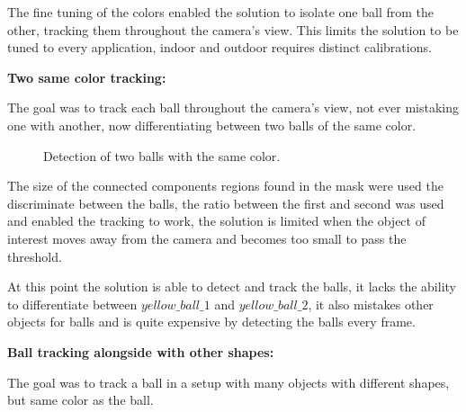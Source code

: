 \documentclass[10pt,twocolumn,letterpaper]{article}
\begin{document}
The fine tuning of the colors enabled the solution to isolate one ball from
the other, tracking them throughout the camera's view. This limits the
solution to be tuned to every application, indoor  and outdoor requires
distinct calibrations.

\bigbreak{}
\textbf{Two same color tracking:}
\bigbreak{}

The goal was to track each ball throughout the camera's view, not ever
mistaking one with another, now differentiating between two balls of the same
color.

\begin{figure}[!h]
\centering
\setlength{\fboxsep}{1pt}
\setlength{\fboxrule}{1pt}
\caption{Detection of two balls with the same color.}\label{fig:same_color}
\end{figure}

The size of the connected components regions found in the mask were used the
discriminate between the balls, the ratio between the first and second was
used and enabled the tracking to work, the solution is limited when the object
of interest moves away from the camera and becomes too small to pass the
threshold.

At this point the solution is able to detect and track the balls, it lacks the
ability to differentiate between $yellow\_ball\_1$ and $yellow\_ball\_2$, it
also mistakes other objects for balls and is quite expensive by detecting the
balls every frame.

\bigbreak{}
\textbf{Ball tracking alongside with other shapes:}
\bigbreak{}

The goal was to track a ball in a setup with many objects with different
shapes, but same color as the ball.
\end{document}
